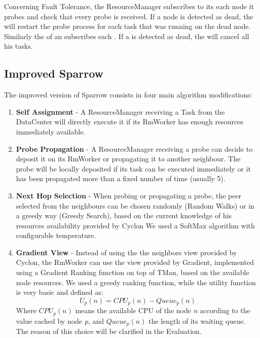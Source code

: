 \documentclass[conference]{IEEEtran}
\begin{document}
  Concerning Fault Tolerance, the ResourceManager subscribes to its
  \FailureDetector each node it probes and check that every probe is
  received. If a node is detected as dead, the \tmast will restart the
  probe process for each task that was running on the dead node. Similarly
  the \RmWorker of an \exc subscribes each \tmast. If a \tmast is detected
  as dead, the \RmWorker will cancel all his tasks.

  \subsection{Improved Sparrow}
  The improved version of Sparrow consists in four main algorithm modifications:
   \begin{enumerate}

  \item \textbf{Self Assignment }- A ResourceManager receiving a Task from the DataCenter will directly execute it if its RmWorker has enough resources immediately available.
  
  \item \textbf{Probe Propagation} - A ResourceManager receiving a probe can decide to deposit it on its RmWorker or propagating it to another neighbour.  The probe will be locally deposited if its task can be executed immediately or it has been propagated more than a fixed number of time (usually 5).
  
   \item \textbf{Next Hop Selection} - When probing or propagating a probe, the peer selected from the neighbours can be chosen randomly (Random Walks) or in a greedy way (Greedy Search), based on the current knowledge of his resources availability provided by Cyclon We used a SoftMax algorithm with configurable temperature.
  
  \item \textbf{Gradient View} - Instead of using the the neighbors view provided by Cyclon, the RmWorker can use the view provided by Gradient, implemented using a Gradient Ranking function on top of TMan, based on the available node resources. We used a greedy ranking function, while the utility function is very basic and defined as:
\begin{equation}
 U_p(n) = CPU_p(n) - Queue_p(n)
\end{equation}
Where $CPU_p(n)$ means the available CPU of the node \textit{n} according to the value cached by node\textit{ p}, and $Queue_p(n)$ the length of its waiting queue.
   The reason of this choice will be clarified in the Evaluation.
  
  \end{enumerate}
\end{document}
